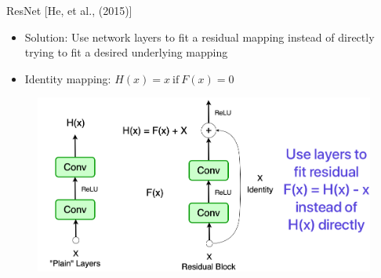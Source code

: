 \documentclass[serif, aspectratio=169]{beamer}
\begin{document}
\begin{frame}{ResNet [He, et al., (2015)]}
	
	\begin{itemize}
		\item Solution: Use network layers to fit a residual mapping instead of directly trying to fit a desired underlying mapping
		\item Identity mapping: $H(x) = x \  \text{if} \ F(x) = 0$
	\end{itemize}
	
	\begin{figure}[htpb]
		\begin{center}
			\hspace{2cm} \includegraphics[keepaspectratio, scale=0.24]{pic/resBlock2}
		\end{center}
	\end{figure}

\end{frame}
\end{document}
